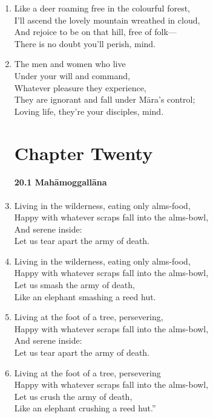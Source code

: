 \documentclass[10pt, openany]{book}
\newcommand*{\vleftofline}[1]{\leavevmode\llap{#1}}
\begin{document}
\begin{enumerate}
\item Like a deer roaming free in the colourful forest,\\
I’ll ascend the lovely mountain wreathed in cloud,\\
And rejoice to be on that hill, free of folk—\\
There is no doubt you’ll perish, mind.

\item The men and women who live \\
Under your will and command,\\
Whatever pleasure they experience,\\
They are ignorant and fall under Māra’s control;\\
Loving life, they’re your disciples, mind.

\chapter*{Chapter Twenty}

\subsubsection*{20.1 Mahāmoggallāna}

\item \vleftofline{“}Living in the wilderness, eating only alms-food,\\
Happy with whatever scraps fall into the alms-bowl,\\
And serene inside:\\
Let us tear apart the army of death.

\item Living in the wilderness, eating only alms-food,\\
Happy with whatever scraps fall into the alms-bowl,\\
Let us smash the army of death,\\
Like an elephant smashing a reed hut.

\item Living at the foot of a tree, persevering,\\
Happy with whatever scraps fall into the alms-bowl,\\
And serene inside:\\
Let us tear apart the army of death.

\item Living at the foot of a tree, persevering\\
Happy with whatever scraps fall into the alms-bowl,\\
Let us crush the army of death,\\
Like an elephant crushing a reed hut.”


\end{enumerate}
\end{document}
